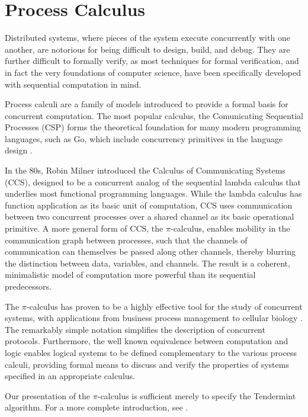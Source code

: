 \section{Process Calculus}

Distributed systems, where pieces of the system execute concurrently with one another,
are notorious for being difficult to design, build, and debug.
They are further difficult to formally verify, 
as most techniques for formal verification, and in fact the very foundations of computer science,
have been specifically developed with sequential computation in mind.

Process calculi are a family of models introduced 
to provide a formal basis for concurrent computation.
The most popular calculus, the Comunicating Sequential Processes (CSP) \cite{csp}
forms the theoretical foundation for many modern programming languages,
such as Go, which include concurrency primitives in the language design \cite{csp_go}.

In the 80s, Robin Milner introduced the Calculus of Communicating Systems (CCS), 
designed to be a concurrent analog of the sequential lambda calculus that underlies most functional programming languages.
While the lambda calculus has function application as its basic unit of computation,
CCS uses communication between two concurrent processes over a shared channel as its basic operational primitive.
A more general form of CCS, the $\pi$-calculus, 
enables mobility in the communication graph between processes, 
such that the channels of communication can themselves be passed along other channels,
thereby blurring the distinction between data, variables, and channels.
The result is a coherent, minimalistic model of computation more powerful than its sequential predecessors.

The $\pi$-calculus has proven to be a highly effective tool for the study of concurrent systems,
with applications from business process management \cite{lucchi2007pi} to cellular biology \cite{phillips2007efficient}.
The remarkably simple notation simplifies the description of concurrent protocols.
Furthermore, the well known equivalence between computation and logic \cite{abramsky1994proofs} enables
logical systems to be defined complementary to the various process calculi,
providing formal means to discuss and verify the properties of systems specified in an appropriate calculus.

Our presentation of the $\pi$-calculus is sufficient merely to specify the Tendermint algorithm.
For a more complete introduction, see \cite{milner1992calculus}.

